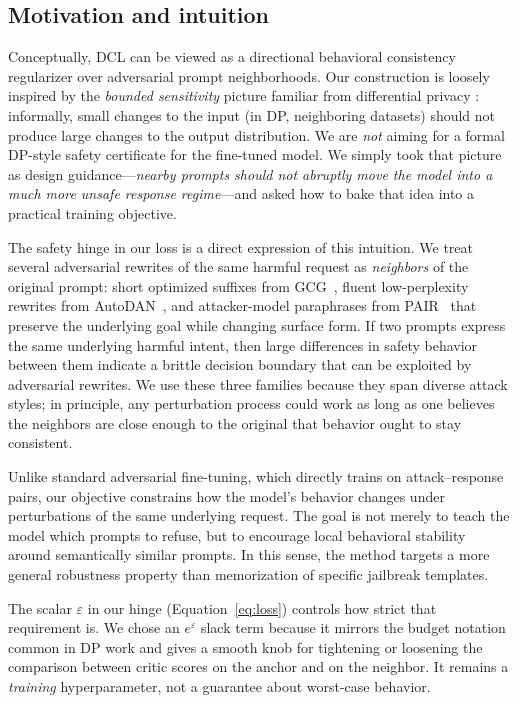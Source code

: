 \documentclass{article}
\begin{document}
\subsection{Motivation and intuition}
\label{sec:method-motivation}
Conceptually, DCL can be viewed as a directional behavioral consistency regularizer over adversarial prompt neighborhoods. Our construction is loosely inspired by the \emph{bounded sensitivity} picture familiar from differential privacy \citep{dwork2006our}: informally, small changes to the input (in DP, neighboring datasets) should not produce large changes to the output distribution. We are \emph{not} aiming for a formal DP-style safety certificate for the fine-tuned model. We simply took that picture as design guidance---\emph{nearby prompts should not abruptly move the model into a much more unsafe response regime}---and asked how to bake that idea into a practical training objective.

The safety hinge in our loss is a direct expression of this intuition. We treat several adversarial rewrites of the same harmful request as \emph{neighbors} of the original prompt: short optimized suffixes from GCG~\cite{zou2023gcg}, fluent low-perplexity rewrites from AutoDAN~\cite{liu2024autodan}, and attacker-model paraphrases from PAIR~\cite{chao2023pair} that preserve the underlying goal while changing surface form. If two prompts express the same underlying harmful intent, then large differences in safety behavior between them indicate a brittle decision boundary that can be exploited by adversarial rewrites. We use these three families because they span diverse attack styles; in principle, any perturbation process could work as long as one believes the neighbors are close enough to the original that behavior ought to stay consistent.


Unlike standard adversarial fine-tuning, which directly trains on attack--response pairs, our objective constrains how the model's behavior changes under perturbations of the same underlying request. The goal is not merely to teach the model which prompts to refuse, but to encourage local behavioral stability around semantically similar prompts. In this sense, the method targets a more general robustness property than memorization of specific jailbreak templates.

The scalar $\varepsilon$ in our hinge (Equation~\ref{eq:loss}) controls how strict that requirement is. We chose an $e^{\varepsilon}$ slack term because it mirrors the budget notation common in DP work and gives a smooth knob for tightening or loosening the comparison between critic scores on the anchor and on the neighbor. It remains a \emph{training} hyperparameter, not a guarantee about worst-case behavior.
\end{document}
